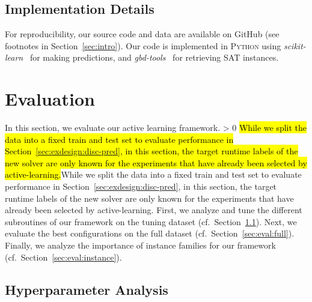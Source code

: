 \documentclass[sn-basic, Numbered]{sn-jnl} %
\newcommand{\showchanges}{1} %
\newcommand{\change}[1]{\ifnum \showchanges > 0 \sethlcolor{yellow}\hl{#1}\else#1\fi}
\begin{document}
\subsection{Implementation Details}
\label{sec:exdesign:impl}

For reproducibility, our source code and data are available on GitHub (see footnotes in Section~\ref{sec:intro}).
Our code is implemented in \textsc{Python} using \emph{scikit-learn}~\cite{scikit-learn} for making predictions, and \emph{gbd-tools}~\cite{IserJ24} for retrieving SAT instances.


\section{Evaluation}
\label{sec:eval}

In this section, we evaluate our active learning framework.
\change{While we split the data into a fixed train and test set to evaluate performance in Section~\ref{sec:exdesign:disc-pred}, in this section, the target runtime labels of the new solver are only known for the experiments that have already been selected by active-learning.}
First, we analyze and tune the different subroutines of our framework on the tuning dataset (cf.~Section~\ref{sec:eval:hyper}).
Next, we evaluate the best configurations on the full dataset (cf.~Section~\ref{sec:eval:full}).
Finally, we analyze the importance of instance families for our framework (cf.~Section~\ref{sec:eval:instance}).

\subsection{Hyperparameter Analysis}
\label{sec:eval:hyper}
\end{document}
